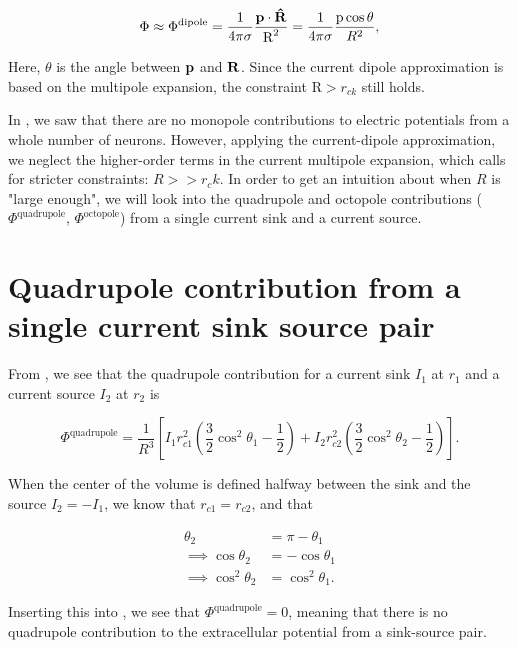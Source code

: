 \begin{equation}
\Phi \approx \Phi^{\mathrm{dipole}} = \frac{1}{4 \pi \sigma} \frac{{\bf p} \cdot {\bf \hat{R}}}{\text{R}^2} = \frac{1}{4 \pi \sigma} \frac{\text{p} \cos \theta}{R^2},
\end{equation}

Here, $\theta$ is the angle between ${\bf p}$ and ${\bf R}$. Since the current dipole approximation is based on the multipole expansion, the constraint $\text{R} > r_{ck}$ still holds.

In , we saw that there are no monopole contributions to electric potentials from a whole number of neurons. However, applying the current-dipole approximation, we neglect the higher-order terms in the current multipole expansion, which calls for stricter constraints: $R >> r_ck$. In order to get an intuition about when $R$ is "large enough", we will look into the quadrupole and octopole contributions ($\Phi^{\mathrm{quadrupole}}$, $\Phi^{\mathrm{octopole}}$) from a single current sink and a current source.

\section{Quadrupole contribution from a single current sink source pair}\label{sec:quad}

From , we see that the quadrupole contribution for a current sink $I_1$ at $r_1$ and a current source $I_2$ at $r_2$ is

\begin{equation}\label{eq:phi_quad}
\Phi^{\mathrm{quadrupole}} = \frac{1}{R^3} \left[ I_1 r_{c1}^2 \left( \frac{3}{2} \cos^2 \theta_1 - \frac{1}{2} \right) + I_2 r_{c2}^2 \left( \frac{3}{2} \cos^2 \theta_2 - \frac{1}{2} \right) \right].
\end{equation}

When the center of the volume is defined halfway between the sink and the source $I_2 = -I_1$, we know that $r_{c1} = r_{c2}$, and that

\begin{align*}
\theta_2 &= \pi - \theta_1 \\
\implies \cos \theta_2 &= -\cos \theta_1 \\
\implies \cos^2 \theta_2 &= \cos^2 \theta_1.
\end{align*}

Inserting this into , we see that $\Phi^{\mathrm{quadrupole}} = 0$, meaning that there is no quadrupole contribution to the extracellular potential from a sink-source pair.

